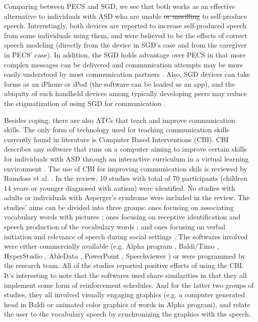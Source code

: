 \documentclass{ut-thesis}
\providecommand{\DIFdeltex}[1]{{\protect\color{red}\sout{#1}}}                      %
\providecommand{\DIFdelbegin}{} %
\providecommand{\DIFdelend}{} %
\providecommand{\DIFdel}[1]{\texorpdfstring{\DIFdeltex{#1}}{}} %
\begin{document}
Comparing between PECS and SGD, we see that both works as an effective alternative to individuals with ASD who are unable \DIFdelbegin \DIFdel{or unwilling }\DIFdelend to self-produce speech.  Interestingly, both devices are reported to increase self-produced speech from some individuals using them, and were believed to be the effects of correct speech modeling (directly from the device in SGD's case and from the caregiver in PECS' case).  In addition, the SGD holds advantage over PECS in that more complex messages can be delivered and communication attempts may be more easily understood by most communication partners \cite{mirenda2001autism}.  Also, SGD devices can take forms as an iPhone or iPod (the software can be loaded as an app), and the ubiquity of such handheld devices among typically developing peers may reduce the stigmatization of using SGD for communication \cite{kagohara2013using}.

Besides coping, there are also ATCs that teach and improve communication skills.  The only form of technology used for teaching communication skills currently found in literature is Computer Based Interventions (CBI).  CBI describes any software that runs on a computer aiming to improve certain skills for individuals with ASD through an interactive curriculum in a virtual learning environment \cite{lang2014assistive}.  The use of CBI for improving communication skils is reviewed by Ramdoss et al. \cite{ramdoss2011use}.  In the review, 10 studies with total of 70 participants (children 14 years or younger diagnosed with autism) were identified.  No studies with adults or individuals with Asperger's syndrome were included in the review.  The studies' aims can be divided into three groups: ones focusing on associating vocabulary words with pictures \cite{moore2000brief, hetzroni2005logos}; ones focusing on receptive identification and speech production of the vocabulary words \cite{heimann1995increasing, bernard1999enhancing, bosseler2003development, coleman2005using, massaro2006read}; and ones focusing on verbal initiation and relevance of speech during social settings \cite{parsons1993effect, simpson2004embedded, hetzroni2004effects}.  The softwares involved were either commercially available (e.g. Alpha program \cite{abledata2010alpha}, Baldi/Timo \cite{2005team}, HyperStudio \cite{mackiev2010welcome}, AbleData \cite{abledata2010alpha}, PowerPoint \cite{1997microsoft}, Speechviewer \cite{synapse2010the}) or were programmed by the research team.  All of the studies reported positive effects of using the CBI.  It's interesting to note that the softwares used share similarities in that they all implement some form of reinforcement schedules.  And for the latter two groups of studies, they all involved visually engaging graphics (e.g. a computer generated head in Baldi or animated color graphics of words in Alpha program), and relate the user to the vocabulary speech by synchronizing the graphics with the speech.
\end{document}
